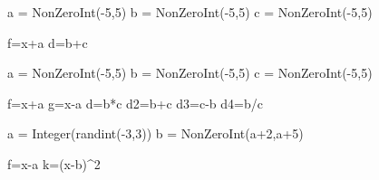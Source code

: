 \begin{sagesilent}
a = NonZeroInt(-5,5)
b = NonZeroInt(-5,5)
c = NonZeroInt(-5,5)

f=x+a
d=b+c
\end{sagesilent}


\begin{sagesilent}
a = NonZeroInt(-5,5)
b = NonZeroInt(-5,5)
c = NonZeroInt(-5,5)

f=x+a
g=x-a
d=b*c
d2=b+c
d3=c-b
d4=b/c

\end{sagesilent}


\begin{sagesilent}
a = Integer(randint(-3,3))
b = NonZeroInt(a+2,a+5)

f=x-a
k=(x-b)^2
\end{sagesilent}

